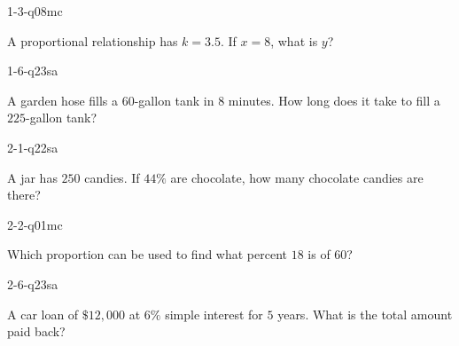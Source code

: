 
\begin{practiceQuestion}{1-3-q08}{mc}
\begin{questionText}
A proportional relationship has $k = 3.5$. If $x = 8$, what is $y$?
\end{questionText}
\end{practiceQuestion}

\begin{practiceQuestion}{1-6-q23}{sa}
\begin{questionText}
A garden hose fills a $60$-gallon tank in $8$ minutes. How long does it take to fill a $225$-gallon tank?
\end{questionText}
\end{practiceQuestion}

\begin{practiceQuestion}{2-1-q22}{sa}
\begin{questionText}
A jar has $250$ candies. If $44\%$ are chocolate, how many chocolate candies are there?
\end{questionText}
\end{practiceQuestion}

\begin{practiceQuestion}{2-2-q01}{mc}
\begin{questionText}
Which proportion can be used to find what percent $18$ is of $60$?
\end{questionText}
\end{practiceQuestion}

\begin{practiceQuestion}{2-6-q23}{sa}
\begin{questionText}
A car loan of $\$12{,}000$ at $6\%$ simple interest for $5$ years. What is the total amount paid back?
\end{questionText}
\end{practiceQuestion}

